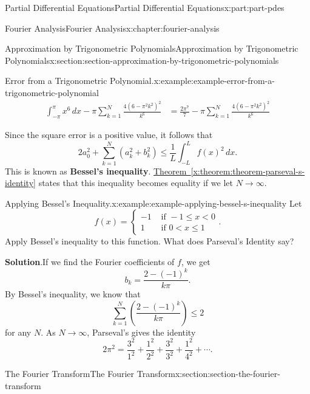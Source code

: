 \documentclass[twoside,10pt,]{book}
\newcommand{\blocktitlefont}{\relax}
\newcommand{\xreffont}{\relax}
\newcommand{\terminology}[1]{\textbf{#1}}
\numberwithin{equation}{part}
\newcommand{\amp}{&}
\begin{document}
\begin{partptx}{Partial Differential Equations}{}{Partial Differential Equations}{}{}{x:part:part-pdes}
\begin{chapterptx}{Fourier Analysis}{}{Fourier Analysis}{}{}{x:chapter:fourier-analysis}
\begin{sectionptx}{Approximation by Trigonometric Polynomials}{}{Approximation by Trigonometric Polynomials}{}{}{x:section:section-approximation-by-trigonometric-polynomials}
\begin{example}{Error from a Trigonometric Polynomial.}{x:example:example-error-from-a-trigonometric-polynomial}
\begin{align*}
\int_{-\pi}^{\pi}x^{6}\,dx - \pi\sum_{k=1}^{N}\frac{4(6 - \pi^{2}k^{2})^{2}}{k^{6}} \amp = \frac{2\pi^{7}}{7} - \pi\sum_{k=1}^{N}\frac{4(6 - \pi^{2}k^{2})^{2}}{k^{6}} 
\end{align*}
%
\end{example}
Since the square error is a positive value, it follows that%
\begin{equation*}
2a_{0}^{2} + \sum_{k=1}^{N}(a_{k}^{2} + b_{k}^{2}) \leq \frac{1}{L}\int_{-L}^{L}f(x)^{2}\,dx\text{.}
\end{equation*}
This is known as \terminology{Bessel's inequality}. \hyperref[x:theorem:theorem-parseval-s-identity]{Theorem~{\xreffont\ref{x:theorem:theorem-parseval-s-identity}}} states that this inequality becomes equality if we let \(N\to\infty\).%
\begin{example}{Applying Bessel's Inequality.}{x:example:example-applying-bessel-s-inequality}%
Let%
\begin{equation*}
f(x) = \begin{cases} -1 \amp\text{ if } -1\leq x < 0 \\ 1 \amp\text{ if } 0 < x \leq 1 \end{cases}\text{.}
\end{equation*}
Apply Bessel's inequality to this function. What does Parseval's Identity say?%
\par\smallskip%
\noindent\textbf{\blocktitlefont Solution}.\hypertarget{g:solution:idp105548816824480}{}\quad{}If we find the Fourier coefficients of \(f\), we get%
\begin{equation*}
b_{k} = \frac{2 - (-1)^{k}}{k\pi}\text{.}
\end{equation*}
By Bessel's inequality, we know that%
\begin{equation*}
\sum_{k=1}^{N}\left(\frac{2 - (-1)^{k}}{k\pi}\right) \leq 2
\end{equation*}
for any \(N\). As \(N\to\infty\), Parseval's gives the identity%
\begin{equation*}
2\pi^{2} = \frac{3^{2}}{1^{2}} + \frac{1^{2}}{2^{2}} + \frac{3^{2}}{3^{2}} + \frac{1^{2}}{4^{2}} + \cdots\text{.}
\end{equation*}
%
\end{example}
\end{sectionptx}
%
%
\typeout{************************************************}
\typeout{************************************************}
%
\begin{sectionptx}{The Fourier Transform}{}{The Fourier Transform}{}{}{x:section:section-the-fourier-transform}

\end{sectionptx}
\end{chapterptx}
\end{partptx}
\end{document}
